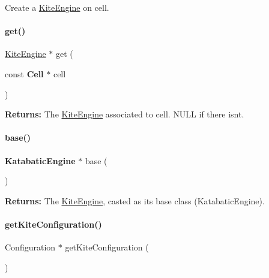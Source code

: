 Create a \mbox{\hyperlink{classKite_1_1KiteEngine}{Kite\+Engine}} on {\ttfamily cell}. \mbox{\label{classKite_1_1KiteEngine_a9905ab1f7a970bc947adb8ddf54e55e1}} 
\paragraph{\texorpdfstring{get()}{get()}}
{\footnotesize\ttfamily \mbox{\hyperlink{classKite_1_1KiteEngine}{Kite\+Engine}} $\ast$ get (\begin{DoxyParamCaption}\item[{const \textbf{ Cell} $\ast$}]{cell }\end{DoxyParamCaption})\hspace{0.3cm}{\ttfamily [static]}}

{\bfseries Returns\+:} The \mbox{\hyperlink{classKite_1_1KiteEngine}{Kite\+Engine}} associated to {\ttfamily cell}. {\ttfamily N\+U\+LL} if there isn\textquotesingle{}t. \mbox{\label{classKite_1_1KiteEngine_a2313df62af32702cf749c15d349af5ea}} 
\paragraph{\texorpdfstring{base()}{base()}}
{\footnotesize\ttfamily \textbf{ Katabatic\+Engine} $\ast$ base (\begin{DoxyParamCaption}{ }\end{DoxyParamCaption})\hspace{0.3cm}{\ttfamily [inline]}}

{\bfseries Returns\+:} The \mbox{\hyperlink{classKite_1_1KiteEngine}{Kite\+Engine}}, casted as it\textquotesingle{}s base class (Katabatic\+Engine). \mbox{\label{classKite_1_1KiteEngine_a1af1f95e771fba5c85a19ea2d686553a}} 
\paragraph{\texorpdfstring{get\+Kite\+Configuration()}{getKiteConfiguration()}}
{\footnotesize\ttfamily Configuration $\ast$ get\+Kite\+Configuration (\begin{DoxyParamCaption}{ }\end{DoxyParamCaption})\hspace{0.3cm}{\ttfamily [inline]}}

